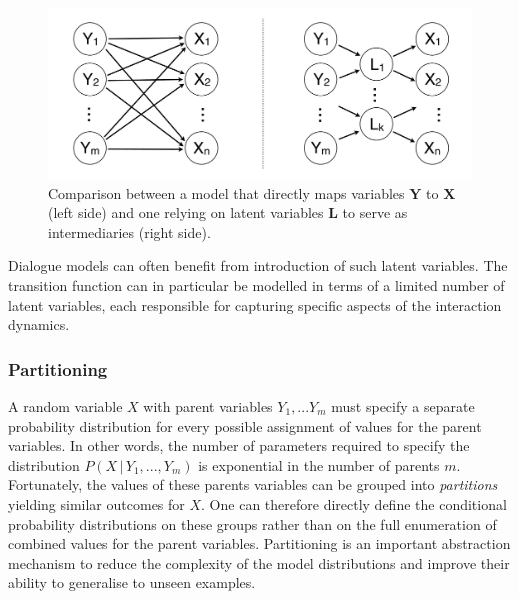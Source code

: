 \begin{figure}[h]
\centering
\includegraphics[scale=0.25]{imgs/latentvariables.pdf}
\caption{Comparison between a model that directly maps variables $\mathbf{Y}$ to $\mathbf{X}$ (left side) and one relying on latent variables $\mathbf{L}$ to serve as intermediaries (right side).}
\label{fig:latentvariables}
\end{figure}

Dialogue models can often benefit from introduction of such latent variables. The transition function can in particular be modelled in terms of a limited number of latent variables, each responsible for capturing specific aspects of the interaction dynamics. 

\subsubsection*{Partitioning}

A random variable $X$ with parent variables $Y_1,...Y_m$ must specify a separate probability distribution for every possible assignment of values for the parent variables. In other words, the number of parameters required to specify the distribution $P(X \, | \, Y_1,..., Y_m)$ is exponential in the number of parents $m$. Fortunately, the values of these parents variables can be grouped into \textit{partitions} yielding similar outcomes for $X$. One can therefore directly define the conditional probability distributions on these groups rather than on the full enumeration of combined values for the parent variables. Partitioning is an important abstraction mechanism to reduce the complexity of the model distributions and improve their ability to generalise to unseen examples. 


